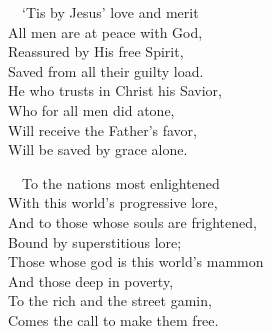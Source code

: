 \documentclass[
]{book}
\begin{document}
~~`Tis by Jesus' love and merit\\
\hspace*{0.333em}\hspace*{0.333em}All men are at peace with God,\\
\hspace*{0.333em}\hspace*{0.333em}Reassured by His free Spirit,\\
\hspace*{0.333em}\hspace*{0.333em}Saved from all their guilty load.\\
\hspace*{0.333em}\hspace*{0.333em}He who trusts in Christ his Savior,\\
\hspace*{0.333em}\hspace*{0.333em}Who for all men did atone,\\
\hspace*{0.333em}\hspace*{0.333em}Will receive the Father's favor,\\
\hspace*{0.333em}\hspace*{0.333em}Will be saved by grace alone.

~~To the nations most enlightened\\
\hspace*{0.333em}\hspace*{0.333em}With this world's progressive lore,\\
\hspace*{0.333em}\hspace*{0.333em}And to those whose souls are frightened,\\
\hspace*{0.333em}\hspace*{0.333em}Bound by superstitious lore;\\
\hspace*{0.333em}\hspace*{0.333em}Those whose god is this world's mammon\\
\hspace*{0.333em}\hspace*{0.333em}And those deep in poverty,\\
\hspace*{0.333em}\hspace*{0.333em}To the rich and the street gamin,\\
\hspace*{0.333em}\hspace*{0.333em}Comes the call to make them free.
\end{document}
